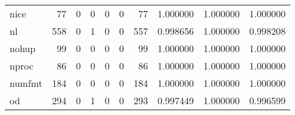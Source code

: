 \begin{longtable}{lrrrrrrrrr}
nice      &                                    77 &                                                  0 &                                                  0 &                                                  0 &                                                  0 &                                                 77 &                                           1.000000 &                               1.000000 &                             1.000000 \\
nl        &                                   558 &                                                  0 &                                                  1 &                                                  0 &                                                  0 &                                                557 &                                           0.998656 &                               1.000000 &                             0.998208 \\
nohup     &                                    99 &                                                  0 &                                                  0 &                                                  0 &                                                  0 &                                                 99 &                                           1.000000 &                               1.000000 &                             1.000000 \\
nproc     &                                    86 &                                                  0 &                                                  0 &                                                  0 &                                                  0 &                                                 86 &                                           1.000000 &                               1.000000 &                             1.000000 \\
numfmt    &                                   184 &                                                  0 &                                                  0 &                                                  0 &                                                  0 &                                                184 &                                           1.000000 &                               1.000000 &                             1.000000 \\
od        &                                   294 &                                                  0 &                                                  1 &                                                  0 &                                                  0 &                                                293 &                                           0.997449 &                               1.000000 &                             0.996599 \\

\end{longtable}
